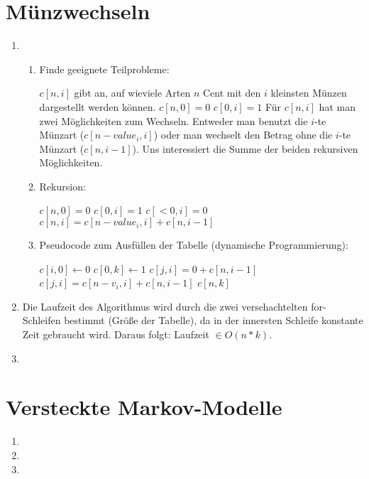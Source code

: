 \documentclass[a4paper,10pt]{scrartcl}
\begin{document}
\section{Münzwechseln}
\begin{enumerate}
 \item 

  \begin{enumerate}
  \item Finde geeignete Teilprobleme:
    
  $c[n,i]$ gibt an, auf wieviele Arten $n$ Cent mit den $i$ kleinsten Münzen dargestellt werden können. \newline
  $c[n, 0] = 0$ \newline
  $c[0, i] = 1$ \newline
  Für $c[n, i]$ hat man zwei Möglichkeiten zum Wechseln. Entweder man benutzt die $i$-te Münzart ($c[n - value_i, i]$) oder man wechselt den Betrag ohne die $i$-te Münzart ($c[n, i - 1]$).
  Uns interessiert die Summe der beiden rekursiven Möglichkeiten.
  \item Rekursion:

  $c[n, 0] = 0$ \newline
  $c[0, i] = 1$ \newline
   $c[< 0, i] = 0$ \newline
  $c[n, i] = c[n - value_i, i] + c[n, i - 1]$
  \item Pseudocode zum Ausfüllen der Tabelle (dynamische Programmierung):

  \begin{algorithmic}
      \STATE $c[i, 0] \gets 0$
   \ENDFOR
      \STATE $c[0,k] \gets 1$
    \ENDFOR
	\STATE $c[j, i] = 0 + c[n, i - 1]$
      \ELSE
	\STATE $c[j, i] = c[n - v_i, i] + c[n, i - 1]$
      \ENDIF
    \ENDFOR
  \ENDFOR
  \RETURN $c[n,k]$
  \end{algorithmic}

  \end{enumerate}

 \item Die Laufzeit des Algorithmus wird durch die zwei verschachtelten for-Schleifen bestimmt (Größe der Tabelle), da in der innersten Schleife konstante Zeit gebraucht wird.
  Daraus folgt: Laufzeit $\in O(n*k)$.
 \item
  
\end{enumerate}

\section{Versteckte Markov-Modelle}
\begin{enumerate}
 \item 
 \item
 \item
\end{enumerate}
\end{document}
